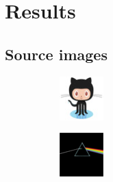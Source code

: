 
\section{Results}

\subsection{Source images}

\begin{figure}[!h]
\centering
\begin{subfigure}{.19\linewidth}
  \centering
  \includegraphics[width=0.7\linewidth]{imgs/octocat}
\end{subfigure}
\begin{subfigure}{.19\linewidth}
  \centering
  \includegraphics[width=0.7\linewidth]{imgs/darkside}

\end{subfigure}
\end{figure}
